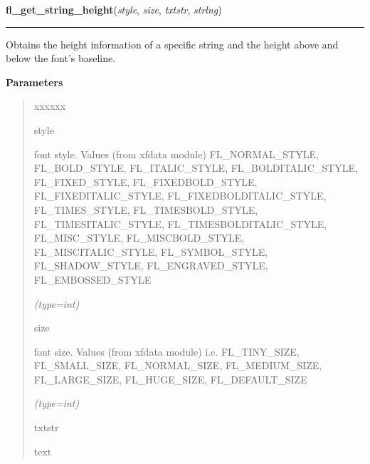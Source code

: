     \label{xformslib:flbasic:fl_get_string_height}

    \vspace{0.5ex}

\hspace{.8\funcindent}\begin{boxedminipage}{\funcwidth}

    \raggedright \textbf{fl\_get\_string\_height}(\textit{style}, \textit{size}, \textit{txtstr}, \textit{strlng})

    \vspace{-1.5ex}

    \rule{\textwidth}{0.5\fboxrule}
\setlength{\parskip}{2ex}
    Obtains the height information of a specific string and the height 
    above and below the font's baseline.

\setlength{\parskip}{1ex}
      \textbf{Parameters}
      \vspace{-1ex}

      \begin{quote}
        \begin{Ventry}{xxxxxx}

          \item[style]

          font style. Values (from xfdata module) FL\_NORMAL\_STYLE, 
          FL\_BOLD\_STYLE, FL\_ITALIC\_STYLE, FL\_BOLDITALIC\_STYLE, 
          FL\_FIXED\_STYLE, FL\_FIXEDBOLD\_STYLE, FL\_FIXEDITALIC\_STYLE, 
          FL\_FIXEDBOLDITALIC\_STYLE, FL\_TIMES\_STYLE, 
          FL\_TIMESBOLD\_STYLE, FL\_TIMESITALIC\_STYLE, 
          FL\_TIMESBOLDITALIC\_STYLE, FL\_MISC\_STYLE, FL\_MISCBOLD\_STYLE,
          FL\_MISCITALIC\_STYLE, FL\_SYMBOL\_STYLE, FL\_SHADOW\_STYLE, 
          FL\_ENGRAVED\_STYLE, FL\_EMBOSSED\_STYLE

            {\it (type=int)}

          \item[size]

          font size. Values (from xfdata module) i.e. FL\_TINY\_SIZE, 
          FL\_SMALL\_SIZE, FL\_NORMAL\_SIZE, FL\_MEDIUM\_SIZE, 
          FL\_LARGE\_SIZE, FL\_HUGE\_SIZE, FL\_DEFAULT\_SIZE

            {\it (type=int)}

          \item[txtstr]

          text


\end{Ventry}
\end{quote}
\end{boxedminipage}
